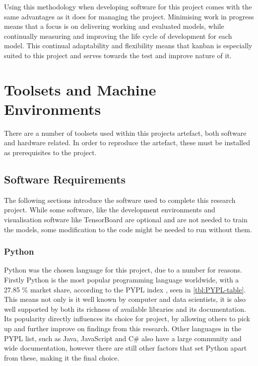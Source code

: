 Using this methodology when developing software for this project comes with the same advantages as it does for managing the project. Minimising work in progress means that a focus is on delivering working and evaluated models, while continually measuring and improving the life cycle of development for each model. This continual adaptability and flexibility means that kanban is especially suited to this project and serves towards the test and improve nature of it.

\section{Toolsets and Machine Environments}
There are a number of toolsets used within this projects artefact, both software and hardware related. In order to reproduce the artefact, these must be installed as prerequisites to the project.

\subsection{Software Requirements}
The following sections introduce the software used to complete this research project. While some software, like the development environments and visualisation software like TensorBoard are optional and are not needed to train the models, some modification to the code might be needed to run without them.


\subsubsection{Python}
Python was the chosen language for this project, due to a number for reasons. Firstly Python is the most popular programming language worldwide, with a 27.85 \% market share, according to the PYPL index \citep{PYPLPopu3:online}, seen in \autoref{tbl:PYPL-table}. This means not only is it well known by computer and data scientists, it is also well supported by both its richness of available libraries and its documentation. Its popularity directly influences its choice for project, by allowing others to pick up and further improve on findings from this research. Other languages in the PYPL list, such as Java, JavaScript and C\# also have a large community and wide documentation, however there are still other factors that set Python apart from these, making it the final choice. 

